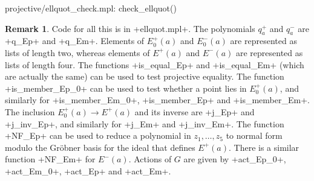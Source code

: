 \documentclass[reqno]{amsart}
\renewcommand{\:}{\colon}
\theoremstyle{definition}
\newtheorem{remark}[theorem]{Remark}
\begin{document}
\begin{checks}
 projective/ellquot_check.mpl: check_ellquot()
\end{checks}
\begin{remark}
 Code for all this is in \fname+ellquot.mpl+.  The polynomials $q^+_a$
 and $q^-_a$ are \mcode+q_Ep+ and \mcode+q_Em+.  Elements of
 $E^+_0(a)$ and $E^-_0(a)$ are represented as lists of length two,
 whereas elements of $E^+(a)$ and $E^-(a)$ are represented as lists of
 length four.  The functions \mcode+is_equal_Ep+ and
 \mcode+is_equal_Em+ (which are actually the same) can be used to test
 projective equality.  The function \mcode+is_member_Ep_0+ can be used
 to test whether a point lies in $E^+_0(a)$, and similarly for
 \mcode+is_member_Em_0+,  \mcode+is_member_Ep+ and
 \mcode+is_member_Em+.  The inclusion $E^+_0(a)\to E^+(a)$ and its
 inverse are \mcode+j_Ep+ and \mcode+j_inv_Ep+, and similarly for
 \mcode+j_Em+ and \mcode+j_inv_Em+.  The function \mcode+NF_Ep+ can be
 used to reduce a polynomial in $z_1,\dotsc,z_5$ to normal form modulo
 the Gr\"obner basis for the ideal that defines $E^+(a)$.  There is a
 similar function \mcode+NF_Em+ for $E^-(a)$.  Actions of $G$ are
 given by \mcode+act_Ep_0+, \mcode+act_Em_0+, \mcode+act_Ep+ and
 \mcode+act_Em+.
\end{remark}
\end{document}
